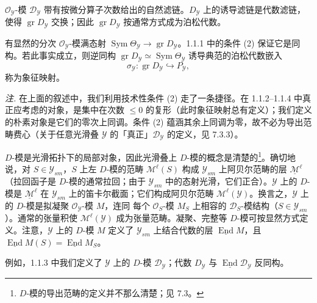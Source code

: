  $\mathcal{O}_{\mathcal{Y}}$-模 $\mathcal{D}_{\mathcal{Y}}$ 带有按微分算子次数给出的自然滤链。$D_{\mathcal{Y}}$ 上的诱导滤链是代数滤链，使得 $\operatorname{gr}D_{\mathcal{Y}}$ 交换；因此 $\operatorname{gr}D_{\mathcal{Y}}$ 按通常方式成为泊松代数。

有显然的分次 $\mathcal{O}_{\mathcal{Y}}$-模满态射 $\operatorname{Sym}\Theta_{\mathcal{Y}}\to\operatorname{gr}D_{\mathcal{Y}}$。1.1.1 中的条件 (2) 保证它是同构。若此事实成立，则逆同构 $\operatorname{gr}D_{\mathcal{Y}}\simeq\operatorname{Sym}\Theta_{\mathcal{Y}}$ 诱导典范的泊松代数嵌入
\begin{equation}\tag{7}
\sigma_{\mathcal{Y}}:\operatorname{gr}D_{\mathcal{Y}}\hookrightarrow P_{\mathcal{Y}},
\end{equation}
称为象征映射。

\emph{注.} 在上面的叙述中，我们利用技术性条件 (2) 走了一条捷径。在 1.1.2--1.1.4 中真正应考虑的对象，是集中在次数 $\le 0$ 的复形（此时象征映射总有定义）；我们定义的朴素对象是它们的零次上同调。条件 (2) 蕴涵其余上同调为零，故不必为导出范畴费心（关于任意光滑叠 $\mathcal{Y}$ 的「真正」$\mathcal{D}_{\mathcal{Y}}$ 的定义，见 7.3.3）。

 $D$-模是光滑拓扑下的局部对象，因此光滑叠上 $D$-模的概念是清楚的\footnote{$D$-模的导出范畴的定义并不那么清楚；见 7.3。}。确切地说，对 $S\in\mathcal{Y}_{sm}$，$S$ 上左 $D$-模的范畴 $\mathcal{M}^{\ell}(S)$ 构成 $\mathcal{Y}_{sm}$ 上阿贝尔范畴的层 $\underline{\mathcal{M}}^{\ell}$（拉回函子是 $D$-模的通常拉回；由于 $\mathcal{Y}_{sm}$ 中的态射光滑，它们正合）。$\mathcal{Y}$ 上的 $D$-模是 $\underline{\mathcal{M}}^{\ell}$ 在 $\mathcal{Y}_{sm}$ 上的笛卡尔截面；它们构成阿贝尔范畴 $\mathcal{M}^{\ell}(\mathcal{Y})$。换言之，$\mathcal{Y}$ 上的 $D$-模是拟凝聚 $\mathcal{O}_{\mathcal{Y}}$-模 $M$，连同%
每个 $\mathcal{O}_S$-模 $M_S$ 上相容的 $\mathcal{D}_S$-模结构（$S\in\mathcal{Y}_{sm}$）。通常的张量积使 $\mathcal{M}^{\ell}(\mathcal{Y})$ 成为张量范畴。凝聚、完整等 $D$-模可按显然方式定义。注意，$\mathcal{Y}$ 上的 $D$-模 $M$ 定义了 $\mathcal{Y}_{sm}$ 上结合代数的层 $\underline{\operatorname{End}}M$，且 $\underline{\operatorname{End}}M(S)=\underline{\operatorname{End}}M_S$。

例如，1.1.3 中我们定义了 $\mathcal{Y}$ 上的 $D$-模 $\mathcal{D}_{\mathcal{Y}}$；代数 $D_{\mathcal{Y}}$ 与 $\underline{\operatorname{End}}\mathcal{D}_{\mathcal{Y}}$ 反同构。

